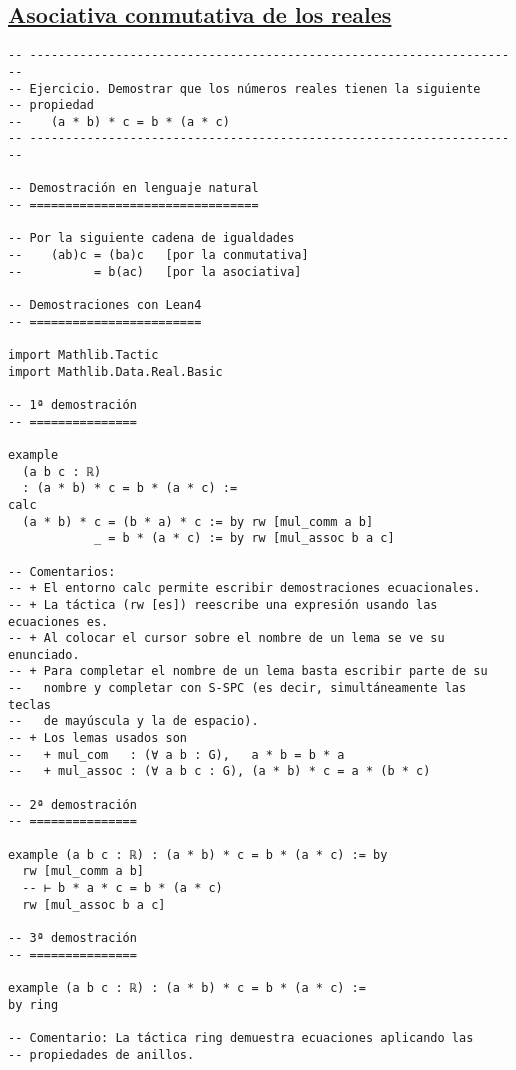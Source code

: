 \subsection{\href{./src/Basicos/Asociativa\_conmutativa\_de\_los\_reales.lean}{Asociativa conmutativa de los reales}}
\label{sec:org6721ebb}
\begin{verbatim}
-- ---------------------------------------------------------------------
-- Ejercicio. Demostrar que los números reales tienen la siguiente
-- propiedad
--    (a * b) * c = b * (a * c)
-- ---------------------------------------------------------------------

-- Demostración en lenguaje natural
-- ================================

-- Por la siguiente cadena de igualdades
--    (ab)c = (ba)c   [por la conmutativa]
--          = b(ac)   [por la asociativa]

-- Demostraciones con Lean4
-- ========================

import Mathlib.Tactic
import Mathlib.Data.Real.Basic

-- 1ª demostración
-- ===============

example
  (a b c : ℝ)
  : (a * b) * c = b * (a * c) :=
calc
  (a * b) * c = (b * a) * c := by rw [mul_comm a b]
            _ = b * (a * c) := by rw [mul_assoc b a c]

-- Comentarios:
-- + El entorno calc permite escribir demostraciones ecuacionales.
-- + La táctica (rw [es]) reescribe una expresión usando las ecuaciones es.
-- + Al colocar el cursor sobre el nombre de un lema se ve su enunciado.
-- + Para completar el nombre de un lema basta escribir parte de su
--   nombre y completar con S-SPC (es decir, simultáneamente las teclas
--   de mayúscula y la de espacio).
-- + Los lemas usados son
--   + mul_com   : (∀ a b : G),   a * b = b * a
--   + mul_assoc : (∀ a b c : G), (a * b) * c = a * (b * c)

-- 2ª demostración
-- ===============

example (a b c : ℝ) : (a * b) * c = b * (a * c) := by
  rw [mul_comm a b]
  -- ⊢ b * a * c = b * (a * c)
  rw [mul_assoc b a c]

-- 3ª demostración
-- ===============

example (a b c : ℝ) : (a * b) * c = b * (a * c) :=
by ring

-- Comentario: La táctica ring demuestra ecuaciones aplicando las
-- propiedades de anillos.
\end{verbatim}

